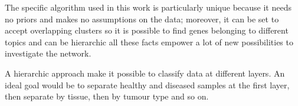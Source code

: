 The specific algorithm used in this work is particularly unique because
it needs no priors and makes no assumptions on the data; moreover, it can
be set to accept overlapping clusters so it is possible to find genes
belonging to different topics and can be hierarchic all these facts
empower a lot of new possibilities to investigate the network.

A hierarchic approach make it possible to classify data at different
layers. An ideal goal would be to separate healthy and diseased samples
at the first layer, then separate by tissue, then by tumour type and so
on.
